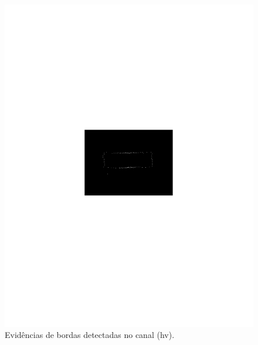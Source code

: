 \documentclass[conference]{IEEEtran}
\begin{document}
\begin{figure}[hbt]
	\includegraphics[scale=0.75]{flevoland_hv_evid_crop.pdf}
	\vspace{-6.0cm}
	\caption{Evidências de bordas detectadas no canal (hv).}	
\label{fig_03}
\end{figure}
\end{document}

